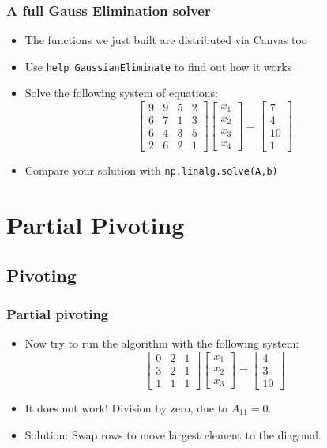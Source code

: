 \begin{frame}[fragile]
  \frametitle{A full Gauss Elimination solver}
  \begin{itemize}
    \item The functions we just built are distributed via Canvas too
    \item Use \lstinline$help GaussianEliminate$ to find out how it works
    \item Solve the following system of equations:
    \[
    \begin{bmatrix}
      9 & 9 & 5 & 2\\ 
      6 & 7 & 1 & 3\\ 
      6 & 4 & 3 & 5\\
      2 & 6 & 2 & 1
    \end{bmatrix}
    \begin{bmatrix}x_1\\x_2\\x_3\\x_4\end{bmatrix} = 
    \begin{bmatrix}7\\4\\10\\1\end{bmatrix}
  \]
  \item Compare your solution with \lstinline$np.linalg.solve(A,b)$
  \end{itemize}
\end{frame}

\section{Partial Pivoting}
\subsection*{Pivoting}

\begin{frame}[fragile]
  \frametitle{Partial pivoting}
  \begin{itemize}
    \item Now try to run the algorithm with the following system:
    \[
    \begin{bmatrix}
      0 & 2 & 1\\ 
      3 & 2 & 1 \\ 
      1 & 1 & 1
    \end{bmatrix}
    \begin{bmatrix}x_1\\x_2\\x_3\end{bmatrix} = 
    \begin{bmatrix}4\\3\\10\end{bmatrix}
  \]
  \pause
  \item It does not work! Division by zero, due to $A_{11}=0$.
  \item Solution: Swap rows to move largest element to the diagonal.
  \end{itemize}
\end{frame}

